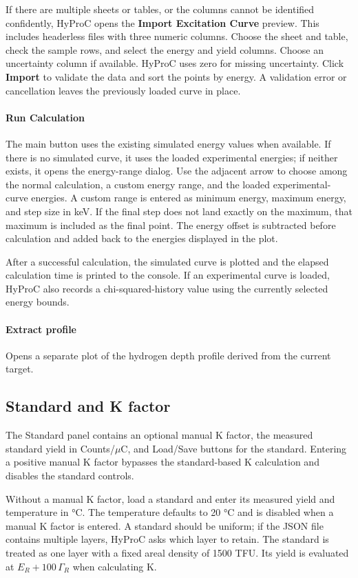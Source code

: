 \documentclass[11pt,a4paper]{article}
\begin{document}
If there are multiple sheets or tables, or the columns cannot be identified confidently, HyProC opens the \textbf{Import Excitation Curve} preview. This includes headerless files with three numeric columns. Choose the sheet and table, check the sample rows, and select the energy and yield columns. Choose an uncertainty column if available. HyProC uses zero for missing uncertainty. Click \textbf{Import} to validate the data and sort the points by energy. A validation error or cancellation leaves the previously loaded curve in place.

\paragraph{Run Calculation}
The main button uses the existing simulated energy values when available. If there is no simulated curve, it uses the loaded experimental energies; if neither exists, it opens the energy-range dialog. Use the adjacent arrow to choose among the normal calculation, a custom energy range, and the loaded experimental-curve energies. A custom range is entered as minimum energy, maximum energy, and step size in keV. If the final step does not land exactly on the maximum, that maximum is included as the final point. The energy offset is subtracted before calculation and added back to the energies displayed in the plot.

After a successful calculation, the simulated curve is plotted and the elapsed calculation time is printed to the console. If an experimental curve is loaded, HyProC also records a chi-squared-history value using the currently selected energy bounds.

\paragraph{Extract profile}
Opens a separate plot of the hydrogen depth profile derived from the current target.

\subsection{Standard and K factor}
The Standard panel contains an optional manual K factor, the measured standard yield in Counts/$\mu$C, and Load/Save buttons for the standard. Entering a positive manual K factor bypasses the standard-based K calculation and disables the standard controls. 

Without a manual K factor, load a standard and enter its measured yield and temperature in °C. The temperature defaults to 20 °C and is disabled when a manual K factor is entered. A standard should be uniform; if the JSON file contains multiple layers, HyProC asks which layer to retain. The standard is treated as one layer with a fixed areal density of 1500 TFU. Its yield is evaluated at $E_R+100\,\Gamma_R$ when calculating K. 
\end{document}
